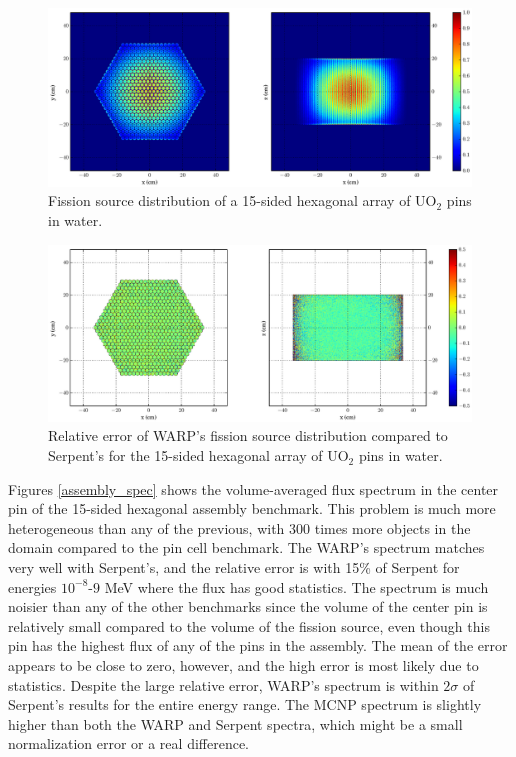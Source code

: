 \begin{figure}[h!]
\centering
\includegraphics[width=\textwidth,trim= 4cm 0cm 6cm 0cm]{graphics/finalresults/assembly_fiss-6.eps}
\caption{Fission source distribution of a 15-sided hexagonal array of UO$_2$ pins in water. \label{assembly_fiss} }
\end{figure}

\begin{figure}[h!]
\centering
\includegraphics[width=\textwidth,trim= 4cm 0cm 6cm 0cm]{graphics/finalresults/assembly_fiss_diff-6.eps}
\caption{Relative error of WARP's fission source distribution compared to Serpent's for the 15-sided hexagonal array of UO$_2$ pins in water. \label{assembly_fiss_diff} }
\end{figure}

Figures \ref{assembly_spec} shows the volume-averaged flux spectrum in the center pin of the 15-sided hexagonal assembly benchmark.  This problem is much more heterogeneous than any of the previous, with 300 times more objects in the domain compared to the pin cell benchmark.  The WARP's spectrum matches very well with Serpent's, and the relative error is with 15\% of Serpent  for energies $10^{-8}$-$9$ MeV where the flux has good statistics.  The spectrum is much noisier than any of the other benchmarks since the volume of the center pin is relatively small compared to the volume of the fission source, even though this pin has the highest flux of any of the pins in the assembly.  The mean of the error appears to be close to zero, however, and the high error is most likely due to statistics.  Despite the large relative error, WARP's spectrum is within $2\sigma$ of Serpent's results for the entire energy range.  The MCNP spectrum is slightly higher than both the WARP and Serpent spectra, which might be a small normalization error or a real difference.  


